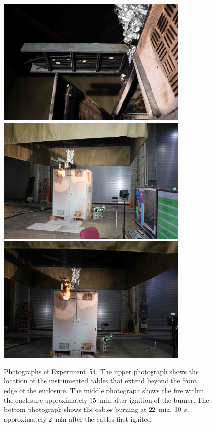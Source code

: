 \begin{figure}[p]
\centering
\includegraphics[height=2.50in]{../FIGURES/Test_54_cables} \\ \vspace{0.1in}
\includegraphics[height=2.50in]{../FIGURES/Test_54_15_min_20_s} \\ \vspace{0.1in}
\includegraphics[height=2.50in]{../FIGURES/Test_54_22_min_31_s}
\caption[Photographs of Experiment~54]{Photographs of Experiment~54. The upper photograph shows the location of the instrumented cables that extend beyond the front edge of the enclosure. The middle photograph shows the fire within the enclosure approximately 15~min after ignition of the burner. The bottom photograph shows the cables burning at 22~min, 30~s, approximately 2~min after the cables first ignited.}
\label{fig:Test_54_photos}
\end{figure}


